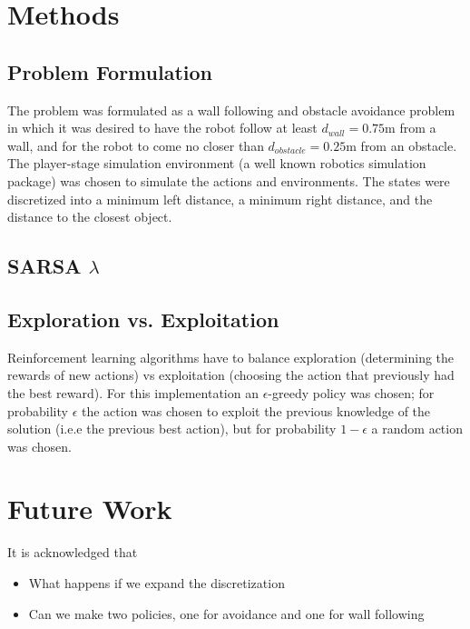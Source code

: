 \documentclass[conference]{IEEEtran}
\begin{document}
\section{Methods}
\subsection{Problem Formulation}
The problem was formulated as a wall following and obstacle avoidance problem in which it was desired to have the robot follow at least $d_{wall} = 0.75 \text{m}$ from a wall, and for the robot to come no closer than $d_{obstacle} = 0.25 \text{m}$ from an obstacle.
The player-stage simulation environment (a well known robotics simulation package) was chosen to simulate the actions and environments.  The states were discretized into a minimum left distance, a minimum right distance, and the distance to the closest object.
\subsection{SARSA $\lambda$}

\subsection{Exploration vs. Exploitation}
Reinforcement learning algorithms have to balance exploration (determining the rewards of new actions) vs exploitation (choosing the action that previously had the best reward). For this implementation an $\epsilon$-greedy policy was chosen; for probability $\epsilon$ the action was chosen to exploit the previous knowledge of the solution (i.e.e the previous best action), but for probability $1-\epsilon$ a random action was chosen.
\section{Future Work}
It is acknowledged that
\begin{itemize}
	\item What happens if we expand the discretization
	\item Can we make two policies, one for avoidance and one for wall following
\end{itemize}


%
%
\end{document}
